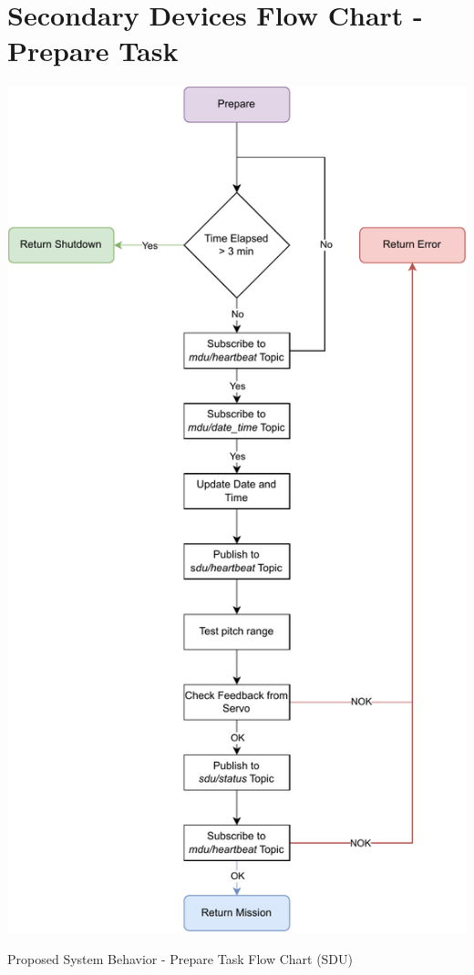 
\chapter{Secondary Devices Flow Chart - Prepare Task} %

\label{AppendixE}

\begin{algorithm}[H]
    \centering
    \includegraphics[scale=0.65]{appendices/assets/SDU_PREPARE.pdf}
    \caption{Proposed System Behavior - Prepare Task Flow Chart (SDU)}
    \label{alg:SDU_PREPARE}
\end{algorithm}

